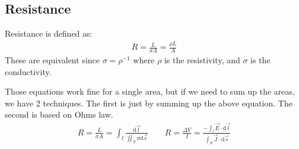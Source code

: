 \documentclass[12pt,letterpaper]{article} \usepackage{amsmath} \usepackage{graphicx} \usepackage[margin=1in]{geometry} \usepackage{longtable}  \usepackage{amssymb}
\begin{document}
	\subsection{Resistance}
	Resistance is defined as:
	\begin{align*}
		R = \frac{L}{\sigma A} = \frac{\rho L}{A}
	\end{align*}
	These are equivalent since $\sigma = \rho^{-1}$ where $\rho$ is the resistivity, and $\sigma$ is the conductivity.
	
	Those equations work fine for a single area, but if we need to sum up the areas, we have 2 techniques. The first is just by summing up the above equation. The second is based on Ohms law. 
	\begin{align*}
		 R = \frac{L}{\sigma A} = \int_l \frac{\mathrm d \vec l}{\iint_S \sigma \mathrm d \vec s} \qquad R = \frac{\Delta V}{I} = \frac{-\int_l \vec E \cdot \mathrm d \vec l}{\int_S \vec J \cdot \mathrm d \vec s} 
	\end{align*}
\end{document}
